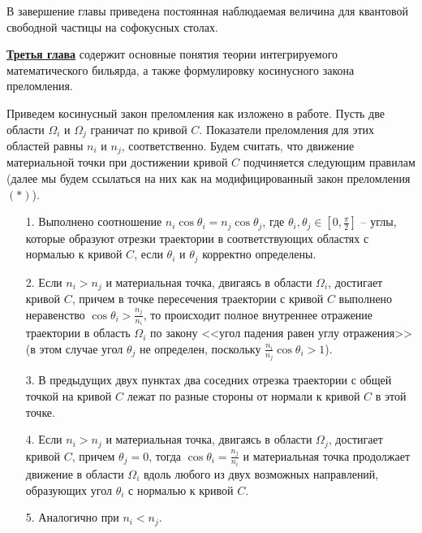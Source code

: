 В завершение главы приведена постоянная наблюдаемая величина для квантовой свободной частицы на софокусных столах.


\underline{\textbf{Третья глава}} содержит основные понятия теории интегрируемого математического бильярда, а также формулировку косинусного закона преломления.

Приведем косинусный закон преломления как изложено в работе. 
Пусть две области $\Omega_i$ и $\Omega_j$ граничат по кривой $C$. 
Показатели преломления для этих областей равны $n_i$ и $n_j$, соответственно.
Будем считать, что движение материальной точки при достижении кривой $C$ подчиняется следующим правилам (далее мы будем ссылаться на них как на модифицированный закон преломления $(\ast)$).
\begin{itemize}
\item[1.] Выполнено соотношение $n_i \cos \theta_i = n_j \cos \theta_j $, где $\theta_i, \theta_j \in [0,\frac{\pi}{2} ]$ -- углы, которые образуют отрезки траектории   в соответствующих областях с нормалью к кривой $C$, если $\theta_i$ и $\theta_j$ корректно определены.
\item[2.] Если $n_i > n_j$ и материальная точка, двигаясь в области $\Omega_i$, достигает кривой $C$, причем в точке пересечения траектории с кривой $C$ выполнено неравенство $\cos \theta_i > \frac{n_j}{n_i}$, то происходит полное внутреннее отражение траектории в область $\Omega_i$ по закону <<угол падения равен углу отражения>> (в этом случае угол $\theta_j$ не определен, поскольку $\frac{n_i}{n_j} \cos \theta_i > 1$). 
\item[3.] В предыдущих двух пунктах два соседних отрезка траектории с общей точкой на кривой $C$ лежат по разные стороны от нормали к кривой $C$ в этой точке.
\item[4.] Если $n_i > n_j$ и материальная точка, двигаясь в области $\Omega_j$, достигает кривой $C$, причем $\theta_j = 0$, тогда $\cos \theta_i = \frac{n_j}{n_i}$ и материальная точка продолжает движение в области $\Omega_i$ вдоль любого из двух возможных направлений, образующих угол $\theta_i$ с нормалью к кривой $C$.
\item[5.] Аналогично при $n_i < n_j$.
\end{itemize}

